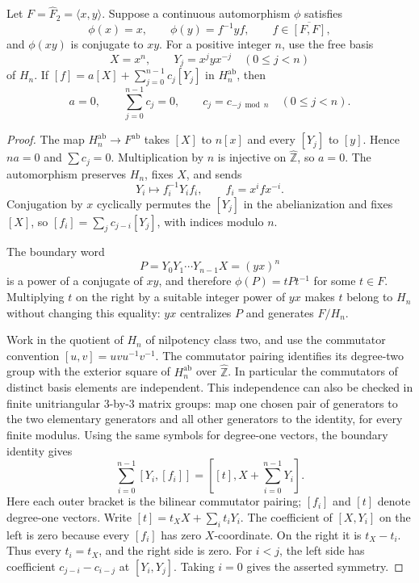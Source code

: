 \begin{lemma}\label{lem:cyclic-cover-symmetry}
Let $F=\widehat F_2=\langle x,y\rangle$. Suppose a continuous
automorphism $\phi$ satisfies
\[
 \phi(x)=x,\qquad \phi(y)=f^{-1}yf,\qquad
 f\in\overline{[F,F]},
\]
and $\phi(xy)$ is conjugate to $xy$. For a positive integer $n$, use
the free basis
\[
 X=x^n,\qquad Y_j=x^jyx^{-j}\quad(0\leq j<n)
\]
of $H_n$. If $[f]=a[X]+\sum_{j=0}^{n-1}c_j[Y_j]$ in
$H_n^{\mathrm{ab}}$, then
\[
 a=0,\qquad \sum_{j=0}^{n-1}c_j=0,\qquad
 c_j=c_{-j\bmod n}\quad(0\leq j<n).
\]
\end{lemma}

\begin{proof}
The map $H_n^{\mathrm{ab}}\to F^{\mathrm{ab}}$ takes $[X]$ to
$n[x]$ and every $[Y_j]$ to $[y]$. Hence $na=0$ and $\sum c_j=0$.
Multiplication by $n$ is injective on $\widehat{\mathbb Z}$, so $a=0$.
The automorphism preserves $H_n$, fixes $X$, and sends
\[
 Y_i\longmapsto f_i^{-1}Y_if_i,\qquad f_i=x^ifx^{-i}.
\]
Conjugation by $x$ cyclically permutes the $[Y_j]$ in the abelianization
and fixes $[X]$, so $[f_i]=\sum_jc_{j-i}[Y_j]$, with indices modulo $n$.

The boundary word
\[
 P=Y_0Y_1\cdots Y_{n-1}X=(yx)^n
\]
is a power of a conjugate of $xy$, and therefore
$\phi(P)=tPt^{-1}$ for some $t\in F$. Multiplying $t$ on the right
by a suitable integer power of $yx$ makes $t$ belong to $H_n$ without
changing this equality: $yx$ centralizes $P$ and generates $F/H_n$.

Work in the quotient of $H_n$ of nilpotency class two, and use the
commutator convention $[u,v]=uvu^{-1}v^{-1}$. The commutator pairing
identifies its degree-two group with the exterior square of
$H_n^{\mathrm{ab}}$ over $\widehat{\mathbb Z}$. In particular the
commutators of distinct basis elements are independent. This independence
can also be checked in finite unitriangular $3$-by-$3$ matrix groups:
map one chosen pair of generators to the two elementary generators and
all other generators to the identity, for every finite modulus.
Using the same symbols for degree-one vectors, the boundary identity gives
\[
 \sum_{i=0}^{n-1}[Y_i,[f_i]]
       =\left[[t],X+\sum_{i=0}^{n-1}Y_i\right].
\]
Here each outer bracket is the bilinear commutator pairing; $[f_i]$
and $[t]$ denote degree-one vectors. Write
$[t]=t_XX+\sum_i t_iY_i$. The coefficient of $[X,Y_i]$ on the left
is zero because every $[f_i]$ has zero $X$-coordinate. On the right it
is $t_X-t_i$. Thus every $t_i=t_X$, and the right side is zero.
For $i<j$, the left side has coefficient $c_{j-i}-c_{i-j}$ at
$[Y_i,Y_j]$. Taking $i=0$ gives the asserted symmetry.
\end{proof}

